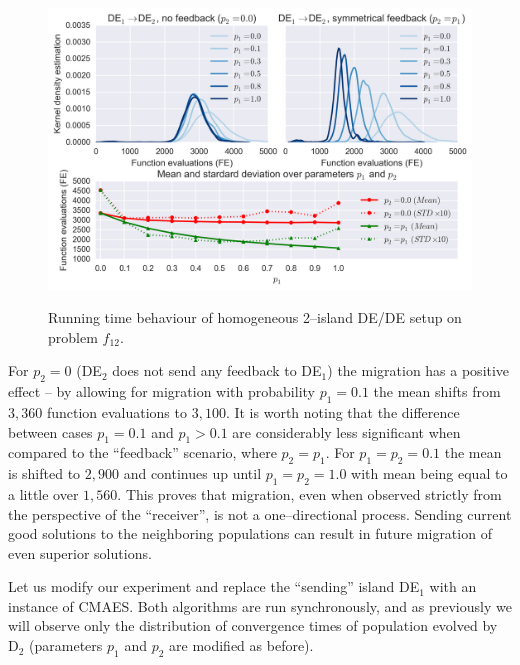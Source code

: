 \documentclass{sig-alternate}
\begin{document}
\begin{figure}[ht]
  \centering
  \includegraphics[width=\columnwidth]{figures/single_jde_jde_9.png}
  \label{fig:single_jde_jde_9}
 \caption{Running time behaviour of homogeneous 2--island DE/DE setup on problem $f_{12}$.}
\end{figure}

For $p_2=0$ (DE$_2$ does not send any feedback to DE$_1$) the migration has a positive effect -- by allowing for migration with probability $p_1 = 0.1$ the mean shifts from $3,360$ function evaluations to $3,100$.
It is worth noting that the difference between cases $p_1=0.1$ and $p_1 > 0.1$ are considerably less significant when compared to the ``feedback'' scenario, where $p_2=p_1$.
For $p_1=p_2=0.1$ the mean is shifted to $2,900$ and continues up until $p_1=p_2=1.0$ with mean being equal to a little over $1,560$.
This proves that migration, even when observed strictly from the perspective of the ``receiver'', is not a one--directional process.
Sending current good solutions to the neighboring populations can result in future migration of even superior solutions.

Let us modify our experiment and replace the ``sending'' island DE$_1$ with an instance of CMAES.
Both algorithms are run synchronously, and as previously we will observe only the distribution of convergence times of population evolved by D$_2$ (parameters $p_1$ and $p_2$ are modified as before).
\end{document}

